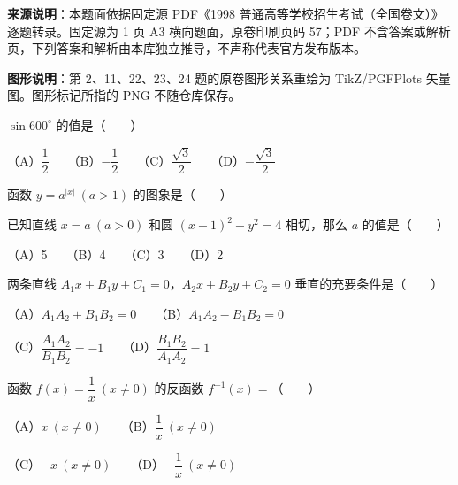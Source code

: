 


\begin{gktip}
\textbf{来源说明}：本题面依据固定源 PDF《1998 普通高等学校招生考试（全国卷文）》逐题转录。固定源为 1 页 A3 横向题面，原卷印刷页码 57；PDF 不含答案或解析页，下列答案和解析由本库独立推导，不声称代表官方发布版本。

\textbf{图形说明}：第 2、11、22、23、24 题的原卷图形关系重绘为 TikZ/PGFPlots 矢量图。图形标记所指的 PNG 不随仓库保存。
\end{gktip}

\begin{question}
$\sin600^\circ$ 的值是\mbox{（　　）}

（A）$\dfrac12$　　（B）$-\dfrac12$　　（C）$\dfrac{\sqrt3}2$　　（D）$-\dfrac{\sqrt3}2$

\Needspace{0.4\textheight}
\end{question}
\begin{question}
函数 $y=a^{|x|}\ (a>1)$ 的图象是\mbox{（　　）}
\nopagebreak[4]
\begin{center}\end{center}
\nopagebreak[4]
\end{question}
\begin{question}
已知直线 $x=a\ (a>0)$ 和圆 $(x-1)^2+y^2=4$ 相切，那么 $a$ 的值是\mbox{（　　）}

（A）5　　（B）4　　（C）3　　（D）2

\end{question}
\begin{question}
两条直线 $A_1x+B_1y+C_1=0$，$A_2x+B_2y+C_2=0$ 垂直的充要条件是\mbox{（　　）}

（A）$A_1A_2+B_1B_2=0$　　（B）$A_1A_2-B_1B_2=0$

（C）$\dfrac{A_1A_2}{B_1B_2}=-1$　　（D）$\dfrac{B_1B_2}{A_1A_2}=1$

\end{question}
\begin{question}
函数 $f(x)=\dfrac1x\ (x\ne0)$ 的反函数 $f^{-1}(x)=$\mbox{（　　）}

（A）$x\ (x\ne0)$　　（B）$\dfrac1x\ (x\ne0)$

（C）$-x\ (x\ne0)$　　（D）$-\dfrac1x\ (x\ne0)$

\end{question}
